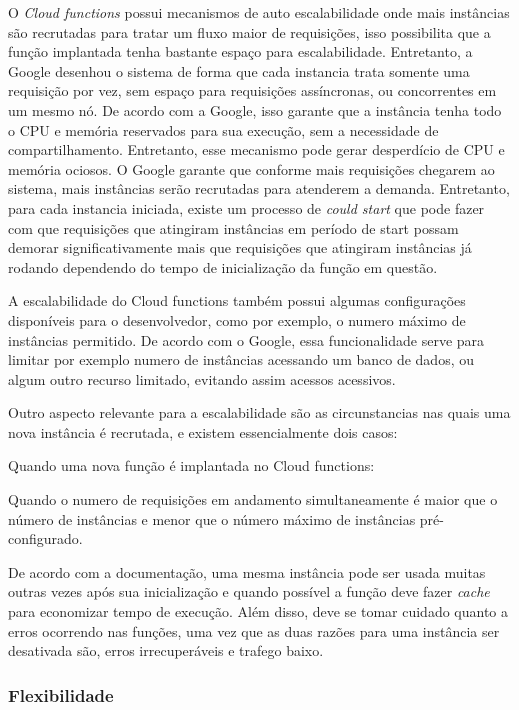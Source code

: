 O \textit{Cloud functions} possui mecanismos de auto escalabilidade onde mais instâncias são recrutadas para tratar um fluxo maior de requisições, isso possibilita que a função implantada tenha bastante espaço para escalabilidade. Entretanto, a Google desenhou o sistema de forma que cada instancia trata somente uma requisição por vez, sem espaço para requisições assíncronas, ou concorrentes em um mesmo nó. De acordo com a Google, isso garante que a instância tenha todo o CPU e memória reservados para sua execução, sem a necessidade de
compartilhamento. Entretanto, esse mecanismo pode gerar desperdício de CPU e memória ociosos. O Google garante que conforme mais requisições chegarem ao sistema, mais instâncias serão recrutadas para atenderem a demanda. Entretanto, para cada instancia iniciada, existe um processo de \textit{could start} que pode fazer com que requisições que atingiram instâncias em período de start possam demorar significativamente mais que requisições que atingiram instâncias
já rodando dependendo do tempo de inicialização da função em questão.

\bigskip
A escalabilidade do Cloud functions também possui algumas configurações disponíveis para o desenvolvedor, como por exemplo, o numero máximo de instâncias permitido. De acordo com o Google, essa funcionalidade serve para limitar por exemplo numero de instâncias acessando um banco de dados, ou algum outro recurso limitado, evitando assim acessos acessivos.

\bigskip
Outro aspecto relevante para a escalabilidade são as circunstancias nas quais uma nova instância é recrutada, e existem essencialmente dois casos:
\begin{alineas}
	\item Quando uma nova função é implantada no Cloud functions:
	\item Quando o numero de requisições em andamento simultaneamente é
	maior que o número de instâncias e menor que o número máximo de
	instâncias
	pré-configurado.
\end{alineas}

\bigskip
De acordo com a documentação, uma mesma instância pode ser usada muitas outras vezes após sua inicialização e quando possível a função deve fazer \textit{cache} para economizar tempo de execução. Além disso, deve se tomar cuidado quanto a erros ocorrendo nas funções, uma vez que as duas razões para uma instância ser desativada são, erros irrecuperáveis e trafego baixo.

\subsubsection{Flexibilidade}

